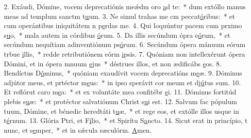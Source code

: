2. Exáudi, Dómine, vocem deprecatiónis meǽdm oro \uline{a}d te:~* dum extóllo manus meas ad templum sanctm t\uline{u}um.
3. Ne simul trahas me cm peccat\uline{ó}ribus:~* et cum operántibus iniquitátem n p\uline{e}rdas me.
4. Qui loquúntur pacem cum prximo s\uline{u}o,~* mala autem in córdibus \uline{ó}rum.
5. Da illis secúndum ópra e\uline{ó}rum,~* et secúndum nequítiam adinventiónum ps\uline{ó}rum.
6. Secúndum ópera mánuum eórum trbue \uline{i}llis,~* redde retributiónem eórm \uline{i}psis.
7. Quóniam non intellexérunt ópera Dómini, et in ópera mnuum \uline{e}jus~* déstrues illos, et non ædificábs \uline{e}os.
8. Bendíctus D\uline{ó}minus,~* quóniam exaudívit vocem deprecatións m\uline{e}æ.
9. Dóminus adjútor meus, et prtéctor m\uline{e}us:~* in ipso sperávit cor meum et dj\uline{ú}tus sum.
10. Et reflórut caro m\uline{e}a:~* et ex voluntáte mea confitébr \uline{e}i.
11. Dóminus fortitúd plebis s\uline{u}æ:~* et protéctor salvatiónum Christ s\uline{u}i est.
12. Salvum fac pópulum tuum, Dómine, et bénedic heredtáti t\uline{u}æ,~* et rege eos, et extólle illos usque in t\uline{é}rnum.
13. Glória Ptri, et F\uline{í}lio,~* et Spirítu S\uline{a}ncto.
14. Sicut erat in princípio, t nunc, et s\uline{e}mper,~* et in sǽcula sæculórm. \uline{A}men.
